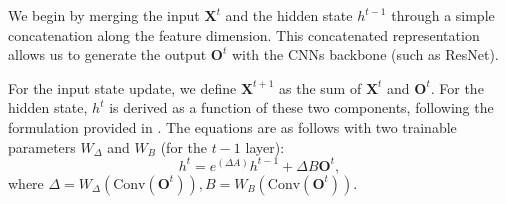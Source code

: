 
 We begin by merging the input $\boldsymbol{X}^{t}$ and the hidden state $h^{t-1}$ through a simple concatenation along the feature dimension. This concatenated representation allows us to generate the output $\boldsymbol{O}^{t}$ with the CNNs backbone (such as ResNet).

 For the input state update, we define $\boldsymbol{X}^{t+1}$ as the sum of $\boldsymbol{X}^{t}$ and $\boldsymbol{O}^{t}$. For the hidden state, $h^t$ is derived as a function of these two components, following the formulation provided in . The equations are as follows with two trainable parameters $W_{\Delta}$ and $W_B$ (for the $t-1$ layer):
\begin{equation}
    \label{CNN_s6_1}
    h^t = e^{(\Delta A)} h^{t-1} + \Delta B \boldsymbol{O}^{t},
\end{equation}
where $\Delta = W_{\Delta} (\text{Conv}(\boldsymbol{O}^{t})),
    B = W_B (\text{Conv}(\boldsymbol{O}^{t}))$.

